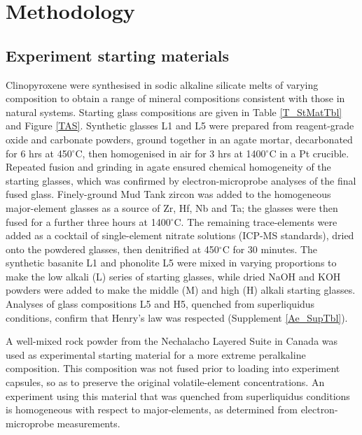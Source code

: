 \documentclass[review,authoryear,12pt]{elsarticle}
\newcommand{\dgC}{$^\circ$C }
\newcommand{\dgCs}{$^\circ$C}
\begin{document}

\section{Methodology}

\subsection{Experiment starting materials}
Clinopyroxene were synthesised in sodic alkaline silicate melts of varying composition to obtain a range of mineral compositions consistent with those in natural systems. Starting glass compositions are given in Table \ref{T_StMatTbl} and Figure \ref{TAS}. Synthetic glasses L1 and L5 were prepared from reagent-grade oxide and carbonate powders, ground together in an agate mortar, decarbonated for 6 hrs at 450\dgCs, then homogenised in air for 3 hrs at 1400\dgC in a Pt crucible. Repeated fusion and grinding in agate ensured chemical homogeneity of the starting glasses, which was confirmed by electron-microprobe analyses of the final fused glass. Finely-ground Mud Tank zircon was added to the homogeneous major-element glasses as a source of Zr, Hf, Nb and Ta; the glasses were then fused for a further three hours at 1400\dgCs. The remaining trace-elements were added as a cocktail of single-element nitrate solutions (ICP-MS standards), dried onto the powdered glasses, then denitrified at 450\dgC for 30 minutes. The synthetic basanite L1 and phonolite L5 were mixed in varying proportions to make the low alkali (L) series of starting glasses, while dried NaOH and KOH powders were added to make the middle (M) and high (H) alkali starting glasses. Analyses of glass compositions L5 and H5, quenched from superliquidus conditions, confirm that Henry's law was respected (Supplement \ref{Ae_SupTbl}).

A well-mixed rock powder from the Nechalacho Layered Suite in Canada \citep[][Unit NLS-9, sample L09-194-405.5, alternative sample name \emph{VM 11-6}]{Moller2016} was used as experimental starting material for a more extreme peralkaline composition. This composition was not fused prior to loading into experiment capsules, so as to preserve the original volatile-element concentrations. An experiment using this material that was quenched from superliquidus conditions is homogeneous with respect to major-elements, as determined from electron-microprobe measurements.
\end{document}
